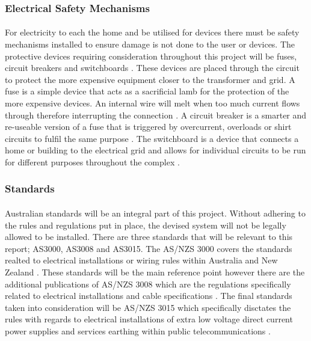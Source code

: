 \subsubsection{Electrical Safety Mechanisms}

\paragraph{}
For electricity to each the home and be utilised for devices there must be safety mechanisms installed to ensure damage is not done to the user or devices. The protective devices requiring consideration throughout this project will be fuses, circuit breakers and switchboards \cite{UnitedStatesDepartmentoftheInterior2000}. These devices are placed through the circuit to protect the more expensive equipment closer to the transformer and grid. A fuse is a simple device that acts as a sacrificial lamb for the protection of the more expensive devices. An internal wire will melt when too much current flows through therefore interrupting the connection \cite{UnitedStatesDepartmentoftheInterior2000}. A circuit breaker is a smarter and re-useable version of a fuse that is triggered by overcurrent, overloads or shirt circuits to fulfil the same purpose \cite{UnitedStatesDepartmentoftheInterior2000}. The switchboard is a device that connects a home or building to the electrical grid and allows for individual circuits to be run for different purposes throughout the complex \cite{UnitedStatesDepartmentoftheInterior2000}.   

 
\subsubsection{Standards}

\paragraph{}
Australian standards will be an integral part of this project. Without adhering to the rules and regulations put in place, the devised system will not be legally allowed to be installed. There are three standards that will be relevant to this report; AS3000, AS3008 and AS3015. The AS/NZS 3000 covers the standards realted to electrical installations or wiring rules within Australia and New Zealand \cite{StandardsAustralia2007}. These standards will be the main reference point however there are the additional publications of AS/NZS 3008 which are the regulations specifically related to electrical installations and cable specifications \cite{StandardsAustralia2010}. The final standards taken into consideration will be AS/NZS 3015 which specifically disctates the rules with regards to electrical installations of extra low voltage direct current power supplies and services earthing within public telecommunications \cite{StandardsAustralia2004}.     

